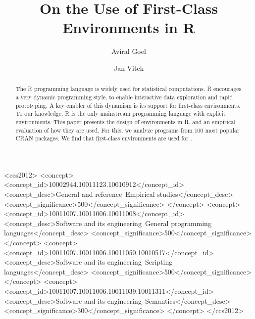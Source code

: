 \documentclass[10pt,review,sigplan,anonymous=true]{acmart}
\newcommand{\authorcomment}[3]{}
\newcommand{\AG}[1]{\authorcomment{orange}{AG}{#1}}
\begin{document}
\title{On the Use of First-Class Environments in R}

\author{Aviral Goel}
\author{Jan Vitek}
\authorsaddresses{}
\renewcommand{\shortauthors}{Goel, et al.}


\begin{abstract}
  The R programming language is widely used for statistical computations. R
  encourages a very dynamic programming style, to enable interactive data
  exploration and rapid prototyping. A key enabler of this dynamism is its
  support for first-class environments. To our knowledge, R is the only
  mainstream programming language with explicit environments. This paper
  presents the design of environments in R, and an empirical evaluation of how
  they are used. For this, we analyze \AG{XXXX} programs from 100 most popular CRAN
  packages. We find that first-class environments are used for \AG{XYZ}.
\end{abstract}

\begin{CCSXML}
<ccs2012>
<concept>
<concept_id>10002944.10011123.10010912</concept_id>
<concept_desc>General and reference~Empirical studies</concept_desc>
<concept_significance>500</concept_significance>
</concept>
<concept>
<concept_id>10011007.10011006.10011008</concept_id>
<concept_desc>Software and its engineering~General programming languages</concept_desc>
<concept_significance>500</concept_significance>
</concept>
<concept>
<concept_id>10011007.10011006.10011050.10010517</concept_id>
<concept_desc>Software and its engineering~Scripting languages</concept_desc>
<concept_significance>500</concept_significance>
</concept>
<concept>
<concept_id>10011007.10011006.10011039.10011311</concept_id>
<concept_desc>Software and its engineering~Semantics</concept_desc>
<concept_significance>300</concept_significance>
</concept>
</ccs2012>
\end{CCSXML}



\maketitle
\end{document}
